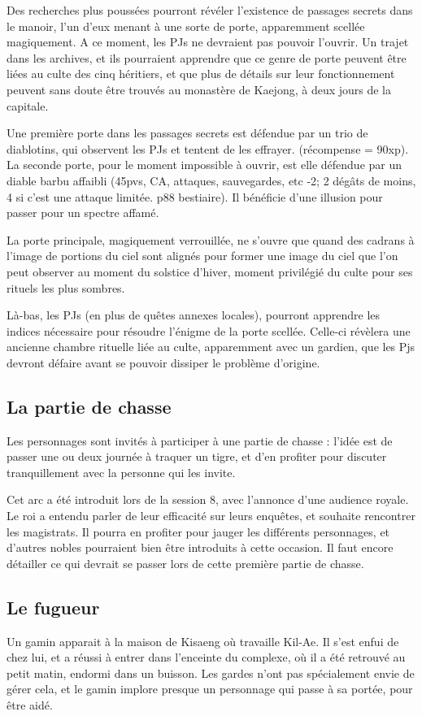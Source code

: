 \documentclass[10pt,a4paper]{book}
\begin{document}
Des recherches plus poussées pourront révéler l'existence de passages secrets dans le manoir, l'un d'eux menant à une sorte de porte, apparemment scellée magiquement. A ce moment, les PJs ne devraient pas pouvoir l'ouvrir. Un trajet dans les archives, et ils pourraient apprendre que ce genre de porte peuvent être liées au culte des cinq héritiers, et que plus de détails sur leur fonctionnement peuvent sans doute être trouvés au monastère de Kaejong, à deux jours de la capitale. 

Une première porte dans les passages secrets est défendue par un trio de diablotins, qui observent les PJs et tentent de les effrayer. (récompense = 90xp). La seconde porte, pour le moment impossible à ouvrir, est elle défendue par un diable barbu affaibli (45pvs, CA, attaques, sauvegardes, etc -2; 2 dégâts de moins, 4 si c'est une attaque limitée. p88 bestiaire). Il bénéficie d'une illusion pour passer pour un spectre affamé.

La porte principale, magiquement verrouillée, ne s'ouvre que quand des cadrans à l'image de portions du ciel sont alignés pour former une image du ciel que l'on peut observer au moment du solstice d'hiver, moment privilégié du culte pour ses rituels les plus sombres.

Là-bas, les PJs (en plus de quêtes annexes locales), pourront apprendre les indices nécessaire pour résoudre l'énigme de la porte scellée. Celle-ci révèlera une ancienne chambre rituelle liée au culte, apparemment avec un gardien, que les Pjs devront défaire avant se pouvoir dissiper le problème d'origine.
\subsection{La partie de chasse}
Les personnages sont invités à participer à une partie de chasse : l'idée est de passer une ou deux journée à traquer un tigre, et d'en profiter pour discuter tranquillement avec la personne qui les invite.

Cet arc a été introduit lors de la session 8, avec l'annonce d'une audience royale. Le roi a entendu parler de leur efficacité sur leurs enquêtes, et souhaite rencontrer les magistrats. Il pourra en profiter pour jauger les différents personnages, et d'autres nobles pourraient bien être introduits à cette occasion. Il faut encore détailler ce qui devrait se passer lors de cette première partie de chasse.
\subsection{Le fugueur}
Un gamin apparait à la maison de Kisaeng où travaille Kil-Ae. Il s'est enfui de chez lui, et a réussi à entrer dans l'enceinte du complexe, où il a été retrouvé au petit matin, endormi dans un buisson. Les gardes n'ont pas spécialement envie de gérer cela, et le gamin implore presque un personnage qui passe à sa portée, pour être aidé. 
\end{document}
